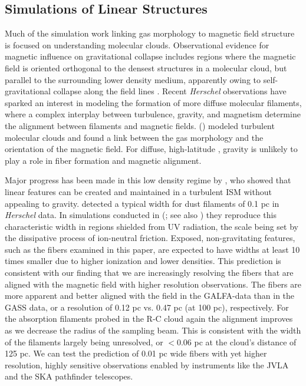 \subsection{Simulations of Linear Structures}

Much of the simulation work linking gas morphology to magnetic field structure is focused on understanding molecular clouds. Observational evidence for magnetic influence on gravitational collapse includes regions where the magnetic field is oriented orthogonal to the densest structures in a molecular cloud, but parallel to the surrounding lower density medium, apparently owing to self-gravitational collapse along the field lines \citep[e.g.][]{Goldsmith:2008hl,Nakamura:2008iv}. Recent \emph{Herschel} observations \citep{Molinari:2010hm, Peretto:2012bu Andre:2010ka} have sparked an interest in modeling the formation of more diffuse molecular filaments, where a complex interplay between turbulence, gravity, and magnetism determine the alignment between filaments and magnetic fields. \citeauthor{Soler:2013dh} (\citeyear{Soler:2013dh}) modeled turbulent molecular clouds and found a link between the gas morphology and the orientation of the magnetic field. For diffuse, high-latitude \hia, gravity is unlikely to play a role in fiber formation and magnetic alignment.

Major progress has been made in this low density regime by \cite{Hennebelle:2013ws}, who showed that linear features can be created and maintained in a turbulent ISM without appealing to gravity. \cite{Arzoumanian:2011wu} detected a typical width for dust filaments of 0.1 pc in \emph{Herschel} data. In simulations conducted in \citeauthor{Hennebelle:2013ws} (\citeyear{Hennebelle:2013ws}; see also \citet{Hennebelle:2013va}) they reproduce this characteristic width in regions shielded from UV radiation, the scale being set by the dissipative process of ion-neutral friction.  Exposed, non-gravitating features, such as the fibers examined in this paper, are expected to have widths at least 10 times smaller due to higher ionization and lower densities. This prediction is consistent with our finding that we are increasingly resolving the fibers that are aligned with the magnetic field with higher resolution observations. The fibers are more apparent and better aligned with the field in the GALFA-\hi data than in the GASS data, or a resolution of 0.12 pc vs. 0.47 pc (at 100 pc), respectively.  For the \hi absorption filaments probed in the R-C cloud again the alignment improves as we decrease the radius of the sampling beam.  This is consistent with the width of the filaments largely being unresolved, or $<0.06$ pc at the cloud's distance of 125 pc. We can test the prediction of 0.01 pc wide fibers with yet higher resolution, highly sensitive observations enabled by instruments like the JVLA and the SKA pathfinder telescopes. 


